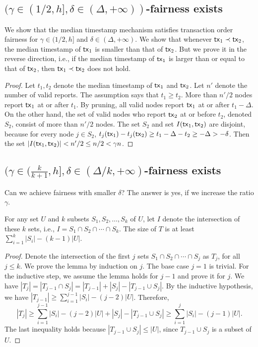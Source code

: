 \documentclass[runningheads]{llncs}
\begin{document}
\subsection{$(\gamma\in(1/2,h], \delta\in(\Delta,+\infty))$-fairness exists}
We show that the median timestamp mechanism satisfies transaction order fairness for $\gamma\in(1/2,h]$ and $\delta\in(\Delta,+\infty)$. We show that whenever $\mathsf{tx}_1\prec \mathsf{tx}_2$, the median timestamp of $\mathsf{tx}_1$ is smaller than that of $\mathsf{tx}_2$. But we prove it in the reverse direction, i.e., if the median timestamp of $\mathsf{tx}_1$ is larger than or equal to that of $\mathsf{tx}_2$, then $\mathsf{tx}_1\prec \mathsf{tx}_2$ does not hold. 

\begin{proof}
    Let $t_1, t_2$ denote the median timestamp of $\mathsf{tx}_1$ and $\mathsf{tx}_2$. Let $n'$ denote the number of valid reports. The assumption says that $t_1\ge t_2$. More than $n'/2$ nodes report $\mathsf{tx}_1$ at or after $t_1$. By pruning, all valid nodes report $\mathsf{tx}_1$ at or after $t_1-\Delta$. On the other hand, the set of valid nodes who report $\mathsf{tx}_2$ at or before $t_2$, denoted $S_2$, consist of more than $n'/2$ nodes. The set $S_2$ and set $I(\mathsf{tx}_1, \mathsf{tx}_2)$ are disjoint, because for every node $j\in S_2$, $t_j(\mathsf{tx}_1) - t_j(\mathsf{tx}_2)\ge t_1 - \Delta -t_2 \ge -\Delta > -\delta$. Then the set $|I(\mathsf{tx}_1,\mathsf{tx}_2)| < n'/2 \le n/2 < \gamma n$.   
\end{proof}

\subsection{$(\gamma\in(\frac{k}{k+1}, h], \delta\in (\Delta/k, +\infty)$-fairness exists}
Can we achieve fairness with smaller $\delta$? The answer is yes, if we increase the ratio $\gamma$. 

\begin{lemma}\label{lemma:intersect}
    For any set $U$ and $k$ subsets $S_1, S_2, \dots, S_k$ of $U$, let $I$ denote the intersection of these $k$ sets, i.e., $I = S_1\cap S_2\cap \cdots \cap S_k$. The size of $T$ is at least $\sum_{i=1}^k |S_i| - (k-1)|U|$. 
\end{lemma}

\begin{proof}
    Denote the intersection of the first $j$ sets $S_1\cap S_2\cap\cdots \cap S_j$ as $T_j$, for all $j\le k$. We prove the lemma by induction on $j$. The base case $j=1$ is trivial. For the inductive step, we assume the lemma holds for $j-1$ and prove it for $j$. We have $|T_j| = |T_{j-1}\cap S_j| = |T_{j-1}| + |S_j| - |T_{j-1}\cup S_j|$. By the inductive hypothesis, we have $|T_{j-1}| \ge \sum_{i=1}^{j-1} |S_i| - (j-2)|U|$. Therefore,
    \[|T_j| \ge \sum_{i=1}^{j-1} |S_i| - (j-2)|U| + |S_j| - |T_{j-1}\cup S_j| \ge \sum_{i=1}^{j} |S_i| - (j-1)|U|.\]
    The last inequality holds because $|T_{j-1}\cup S_j|\le |U|$, since $T_{j-1}\cup S_j$ is a subset of $U$.  
\end{proof}
\end{document}
